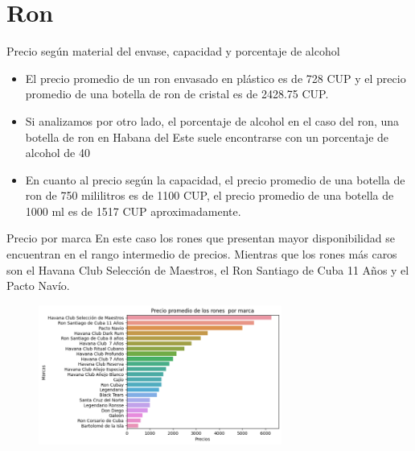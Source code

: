 \documentclass{beamer}
\begin{document}
\section{Ron}
    \begin{frame}{Precio según material del envase, capacidad y porcentaje de alcohol}
        \begin{itemize}
             \item  El precio promedio de un ron envasado en plástico es de 728 CUP y el precio promedio de una botella de ron de cristal es de 2428.75 CUP.
            \item Si analizamos por otro lado, el porcentaje de alcohol en el caso del ron, una botella de ron en Habana del Este suele encontrarse con un porcentaje de alcohol de 40%
             \item En cuanto al precio según la capacidad, el precio promedio de una botella de ron de 750 mililitros es de 1100 CUP, el precio promedio de una botella de 1000 ml es de 1517 CUP aproximadamente.
        \end{itemize}

    \end{frame}
    \begin{frame}{Precio por marca}
        En este caso los rones que presentan mayor disponibilidad se encuentran en el rango intermedio de precios. Mientras que los rones más caros son el Havana Club Selección de Maestros, el Ron Santiago de Cuba 11 Años y el Pacto Navío.
        \begin{figure}[h]
        	\centering
        	\includegraphics[width=8cm]{rum prices.png}
        \end{figure}

    \end{frame}
\end{document}
